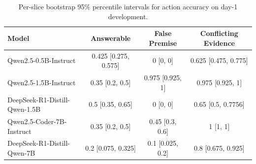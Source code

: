\begin{table}[t]
\centering
\small
\setlength{\tabcolsep}{3.8pt}
\begin{tabular}{lccc}
\toprule
Model & Answerable & False Premise & Conflicting Evidence \\
\midrule
Qwen2.5-0.5B-Instruct & 0.425 [0.275, 0.575] & 0 [0, 0] & 0.625 [0.475, 0.775] \\
Qwen2.5-1.5B-Instruct & 0.35 [0.2, 0.5] & 0.975 [0.925, 1] & 0.975 [0.925, 1] \\
DeepSeek-R1-Distill-Qwen-1.5B & 0.5 [0.35, 0.65] & 0 [0, 0] & 0.65 [0.5, 0.7756] \\
Qwen2.5-Coder-7B-Instruct & 0.35 [0.2, 0.5] & 0.45 [0.3, 0.6] & 1 [1, 1] \\
DeepSeek-R1-Distill-Qwen-7B & 0.2 [0.075, 0.325] & 0.1 [0.025, 0.2] & 0.8 [0.675, 0.925] \\
\bottomrule
\end{tabular}
\caption{Per-slice bootstrap 95\% percentile intervals for action accuracy on day-1 development.}
\label{tab:day1-scale-reasoning-ci-slices}
\end{table}
